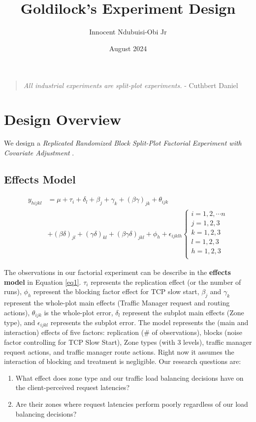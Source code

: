 \documentclass{article}
\title{Goldilock's Experiment Design}
\author{Innocent Ndubuisi-Obi Jr }
\date{August 2024}
\begin{document}
\maketitle

\begin{quote}
\textit{\quad All industrial experiments are split-plot experiments.} - Cuthbert Daniel
\end{quote}

\section{Design Overview}
We design a \textit{Replicated Randomized Block Split-Plot Factorial Experiment with Covariate Adjustment} \cite{Montgomery2020-qa}. 



\subsection{Effects Model}
\begin{equation} \label{eq1}
\begin{split}
    y_{hijkl} & =  \mu + \tau_i + \delta_{l} + \beta_{j} + \gamma_{k} + (\beta\gamma)_{jk} + \theta_{ijk}  \\
    &  + (\beta\delta)_{jl} + (\gamma\delta)_{kl} + (\beta\gamma\delta)_{jkl} + \phi_h 
 + \epsilon_{ijklh}
    \begin{cases}
        i = 1, 2, \cdots n \\
        j = 1, 2, 3 \\
        k = 1, 2, 3 \\
        l = 1, 2, 3 \\
        h = 1, 2, 3\\
    \end{cases}
\end{split}
\end{equation}

The observations in our factorial experiment can be describe in the \textbf{effects model} in Equation \ref{eq1}. $\tau_i$ represents the replication effect (or the number of runs), $\phi_h$ represent the blocking factor effect for TCP slow start, $\beta_{j}$ and $\gamma_k$ represent the whole-plot main effects (Traffic Manager request and routing actions), $\theta_{ijk}$ is the whole-plot error, $\delta_{l}$ represent the subplot main effects (Zone type), and $\epsilon_{ijkl}$ represents the subplot error. The model represents the (main and interaction) effects of five factors: replication (\# of observations), blocks (noise factor controlling for TCP Slow Start), Zone types (with 3 levels), traffic manager request actions, and traffic manager route actions. Right now it assumes the interaction of blocking and treatment is negligible. Our research questions are:
\begin{enumerate}
    \item What effect does zone type and our traffic load balancing decisions have on the client-perceived request latencies?
    \item Are their zones where request latencies perform poorly regardless of our load balancing decisions?
\end{enumerate}
\end{document}
